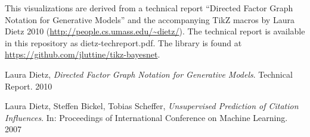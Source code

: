 \documentclass[11pt]{report}
\begin{document}
This visualizations are derived from a technical report ``Directed Factor Graph Notation for Generative Models'' and the accompanying TikZ macros by Laura Dietz 2010 (\url{http://people.cs.umass.edu/~dietz/}). The technical report is available in this repository as dietz-techreport.pdf. The library is found at \url{https://github.com/jluttine/tikz-bayesnet}.

\begin{thebibliography}{9}

  Laura Dietz,
  \emph{Directed Factor Graph Notation for Generative Models}.
  Technical Report. 2010

  Laura Dietz, Steffen Bickel, Tobias Scheffer,
  \emph{Unsupervised Prediction of Citation Influences}.
  In: Proceedings of International Conference on Machine
  Learning. 2007


\end{thebibliography}
\end{document}
